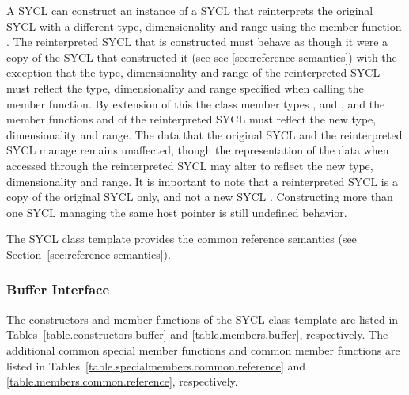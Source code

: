 A SYCL  can construct an instance of a SYCL 
that reinterprets the original SYCL  with a different
type, dimensionality and range using the member function
. The reinterpreted SYCL  that is
constructed must behave as though it were a copy of the SYCL 
that constructed it (see sec \ref{sec:reference-semantics}) with the exception
that the type, dimensionality and range of the reinterpreted SYCL
 must reflect the type, dimensionality and range specified
when calling the  member function. By extension of this
the class member types ,  and
, and the member functions 
and  of the reinterpreted SYCL  must
reflect the new type, dimensionality and range. The data that the original SYCL
 and the reinterpreted SYCL  manage
remains unaffected, though the representation of the data when accessed through
the reinterpreted SYCL  may alter to reflect the new type,
dimensionality and range. It is important to note that a reinterpreted SYCL
 is a copy of the original SYCL  only,
and not a new SYCL . Constructing more than one SYCL
 managing the same host pointer is still undefined behavior.

The SYCL  class template provides the common reference
semantics (see Section~\ref{sec:reference-semantics}).


\subsubsection{Buffer Interface}

The constructors and member functions of the SYCL  class template are listed in Tables~\ref{table.constructors.buffer} and \ref{table.members.buffer}, respectively. The additional common special member functions and common member functions are listed in Tables~\ref{table.specialmembers.common.reference} and \ref{table.members.common.reference}, respectively.

